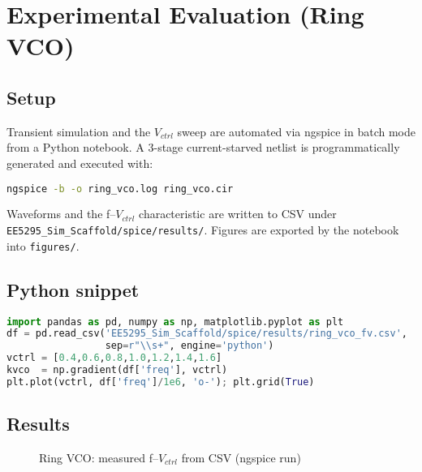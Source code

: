 \section{Experimental Evaluation (Ring VCO)}
\label{sec:ring_vco_experiment}
\subsection*{Setup}
Transient simulation and the \(V_{ctrl}\) sweep are automated via ngspice in batch mode from a Python notebook. A 3-stage current-starved netlist is programmatically generated and executed with:
\begin{lstlisting}[language=bash]
ngspice -b -o ring_vco.log ring_vco.cir
\end{lstlisting}

Waveforms and the f--\(V_{ctrl}\) characteristic are written to CSV under \texttt{EE5295\_Sim\_Scaffold/spice/results/}. Figures are exported by the notebook into \texttt{figures/}.

\subsection*{Python snippet}
\begin{lstlisting}[language=Python]
import pandas as pd, numpy as np, matplotlib.pyplot as plt
df = pd.read_csv('EE5295_Sim_Scaffold/spice/results/ring_vco_fv.csv',
                 sep=r"\\s+", engine='python')
vctrl = [0.4,0.6,0.8,1.0,1.2,1.4,1.6]
kvco  = np.gradient(df['freq'], vctrl)
plt.plot(vctrl, df['freq']/1e6, 'o-'); plt.grid(True)
\end{lstlisting}

\subsection*{Results}
\begin{figure}[H]
  \centering
  \caption{Ring VCO: measured f--$V_{ctrl}$ from CSV (ngspice run)}
\end{figure}

